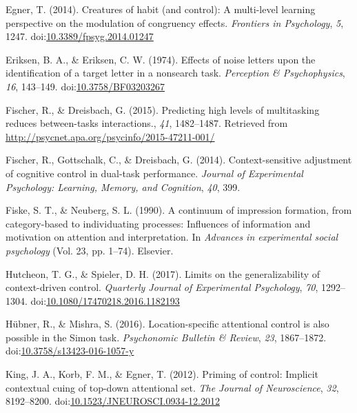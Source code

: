 \documentclass[english,,man,floatsintext]{apa6}
\begin{document}
\leavevmode\hypertarget{ref-egner_creatures_2014}{}%
Egner, T. (2014). Creatures of habit (and control): A multi-level learning perspective on the modulation of congruency effects. \emph{Frontiers in Psychology}, \emph{5}, 1247. doi:\href{https://doi.org/10.3389/fpsyg.2014.01247}{10.3389/fpsyg.2014.01247}

\leavevmode\hypertarget{ref-eriksen_effects_1974}{}%
Eriksen, B. A., \& Eriksen, C. W. (1974). Effects of noise letters upon the identification of a target letter in a nonsearch task. \emph{Perception \& Psychophysics}, \emph{16}, 143--149. doi:\href{https://doi.org/10.3758/BF03203267}{10.3758/BF03203267}

\leavevmode\hypertarget{ref-fischer_predicting_2015}{}%
Fischer, R., \& Dreisbach, G. (2015). Predicting high levels of multitasking reduces between-tasks interactions., \emph{41}, 1482--1487. Retrieved from \url{http://psycnet.apa.org/psycinfo/2015-47211-001/}

\leavevmode\hypertarget{ref-fischer_context-sensitive_2014}{}%
Fischer, R., Gottschalk, C., \& Dreisbach, G. (2014). Context-sensitive adjustment of cognitive control in dual-task performance. \emph{Journal of Experimental Psychology: Learning, Memory, and Cognition}, \emph{40}, 399.

\leavevmode\hypertarget{ref-fiske_continuum_1990}{}%
Fiske, S. T., \& Neuberg, S. L. (1990). A continuum of impression formation, from category-based to individuating processes: Influences of information and motivation on attention and interpretation. In \emph{Advances in experimental social psychology} (Vol. 23, pp. 1--74). Elsevier.

\leavevmode\hypertarget{ref-hutcheon_limits_2017}{}%
Hutcheon, T. G., \& Spieler, D. H. (2017). Limits on the generalizability of context-driven control. \emph{Quarterly Journal of Experimental Psychology}, \emph{70}, 1292--1304. doi:\href{https://doi.org/10.1080/17470218.2016.1182193}{10.1080/17470218.2016.1182193}

\leavevmode\hypertarget{ref-hubner_location-specific_2016}{}%
Hübner, R., \& Mishra, S. (2016). Location-specific attentional control is also possible in the Simon task. \emph{Psychonomic Bulletin \& Review}, \emph{23}, 1867--1872. doi:\href{https://doi.org/10.3758/s13423-016-1057-y}{10.3758/s13423-016-1057-y}

\leavevmode\hypertarget{ref-king_priming_2012}{}%
King, J. A., Korb, F. M., \& Egner, T. (2012). Priming of control: Implicit contextual cuing of top-down attentional set. \emph{The Journal of Neuroscience}, \emph{32}, 8192--8200. doi:\href{https://doi.org/10.1523/JNEUROSCI.0934-12.2012}{10.1523/JNEUROSCI.0934-12.2012}
\end{document}
